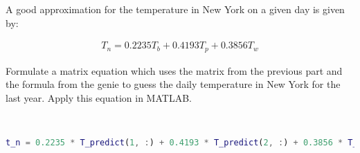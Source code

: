 A good approximation for the temperature in New York on a given day is given by: 

\begin{align*}
    T_n = 0.2235T_b + 0.4193T_p + 0.3856T_w
\end{align*}

Formulate a matrix equation which uses the matrix from the previous part and the formula from the genie to guess the daily temperature in New York for the last year. Apply this equation in MATLAB.

\begin{solution} \ \\
\begin{lstlisting}[language=Matlab]
t_n = 0.2235 * T_predict(1, :) + 0.4193 * T_predict(2, :) + 0.3856 * T_predict(3, :)
\end{lstlisting}
\end{solution}
